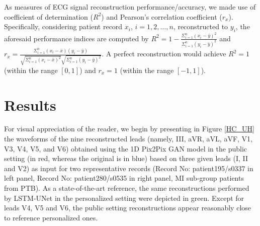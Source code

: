 \documentclass[conference]{IEEEtran}
\begin{document}

As measures of ECG signal reconstruction performance/accuracy, we made use of coefficient of determination ($R^2$) and Pearson's correlation coefficient ($r_x$). Specifically, considering patient record $x_i$, $i=1,2,...,n$, reconstructed to $y_i$, the aforesaid performance indices are computed by $R^2 = 1-\frac{\Sigma_{i=1}^n {(x_i-\bar{y})}^2}{\Sigma_{i=1}^n {(y_i-\bar{y})}^2}$ and $r_x = \frac{\Sigma_{i=1}^n {(x_i-\bar{x})} {(y_i-\bar{y})}}{\sqrt{\Sigma_{i=1}^n {(x_i-\bar{x})}^2} \sqrt{\Sigma_{i=1}^n {(y_i-\bar{y})}^2}}$. A perfect reconstruction would achieve $R^2 = 1$ (within the range $[0,1]$) and $r_x = 1$ (within the range $[-1,1]$).



\section{Results}

For visual appreciation of the reader, we begin by presenting in Figure \ref{HC_UH} the waveforms of the nine reconstructed leads (namely, III, aVR, aVL, aVF, V1, V3, V4, V5, and V6) obtained using the 1D Pix2Pix GAN model in the public setting (in red, whereas the original is in blue) based on three given leads (I, II and V2) as input for two representative records (Record No: patient195/s0337 in left panel, Record No: patient280/s0535 in right panel, MI sub-group patients from PTB). As a state-of-the-art reference, the same reconstructions performed by LSTM-UNet in the personalized setting were depicted in green. Except for leads V4, V5 and V6, the public setting reconstructions appear reasonably close to reference personalized ones.  


\end{document}
